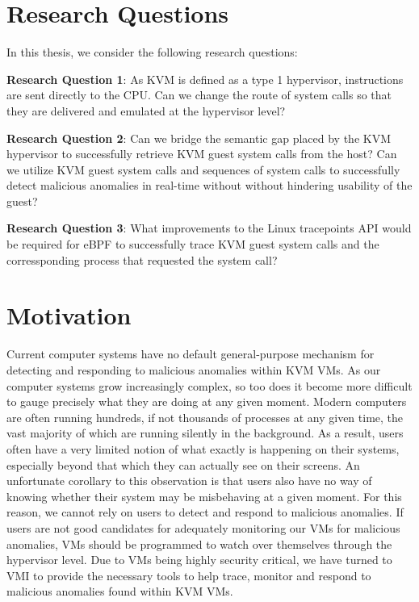 \documentclass{report}
\begin{document}
\begin{spacing}{1.5}
\section{Research Questions}

{\large
In this thesis, we consider the following research questions:
\newline
}

{\large
\textbf{Research Question 1}: As KVM is defined as a type 1 hypervisor, instructions are sent directly to the CPU. Can we change the route of system calls so that they are delivered and emulated at the hypervisor level?
\newline
}

{\large
\textbf{Research Question 2}: Can we bridge the semantic gap placed by the KVM hypervisor to successfully retrieve KVM guest system calls from the host? Can we utilize KVM guest system calls and sequences of system calls to successfully detect malicious anomalies in real-time without without hindering usability of the guest?
\newline
}

{\large
\textbf{Research Question 3}: What improvements to the Linux tracepoints API would be required for eBPF to successfully trace KVM guest system calls and the corressponding process that requested the system call?
\newline
}








\section{Motivation}
{\large
Current computer systems have no default general-purpose mechanism for detecting and responding to malicious anomalies within KVM VMs. As our computer systems grow increasingly complex, so too does it become more difficult to gauge precisely what they are doing at any given moment. Modern computers are often running hundreds, if not thousands of processes at any given time, the vast majority of which are running silently in the background. As a result, users often have a very limited notion of what exactly is happening on their systems, especially beyond that which they can actually see on their screens. An unfortunate corollary to this observation is that users also have no way of knowing whether their system may be misbehaving at a given moment. For this reason, we cannot rely on users to detect and respond to malicious anomalies. If users are not good candidates for adequately monitoring our VMs for malicious anomalies, VMs should be programmed to watch over themselves through the hypervisor level. Due to VMs being highly security critical, we have turned to VMI to provide the necessary tools to help trace, monitor and respond to malicious anomalies found within KVM VMs.
\newline
}





\end{spacing}
\end{document}
